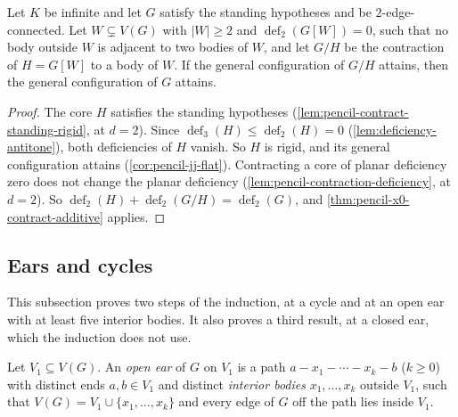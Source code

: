 \begin{corollary}
  \label{cor:pencil-x0-contract-rigid}
  \leanok
  Let $K$ be infinite and let $G$ satisfy the standing hypotheses and be
  $2$-edge-connected. Let $W \subsetneq V(G)$ with $|W| \ge 2$ and
  $\operatorname{def}_2(G[W]) = 0$, such that no body outside $W$ is
  adjacent to two bodies of $W$, and let $G/H$ be the contraction of
  $H = G[W]$ to a body of $W$. If the general configuration of $G/H$
  attains, then the general configuration of $G$ attains.
\end{corollary}
\begin{proof}
  \leanok
  The core $H$ satisfies the standing hypotheses
  (\cref{lem:pencil-contract-standing-rigid}, at $d = 2$). Since
  $\operatorname{def}_3(H) \le \operatorname{def}_2(H) = 0$
  (\cref{lem:deficiency-antitone}), both deficiencies of $H$ vanish. So
  $H$ is rigid, and its general configuration attains
  (\cref{cor:pencil-jj-flat}). Contracting a core of planar deficiency
  zero does not change the planar deficiency
  (\cref{lem:pencil-contraction-deficiency}, at $d = 2$). So
  $\operatorname{def}_2(H) + \operatorname{def}_2(G/H) =
  \operatorname{def}_2(G)$, and \cref{thm:pencil-x0-contract-additive}
  applies.
\end{proof}

\subsection{Ears and cycles}
\label{sec:main-component-chain}

This subsection proves two steps of the induction, at a cycle and at an
open ear with at least five interior bodies. It also proves a third
result, at a closed ear, which the induction does not use.

\begin{definition}
  \label{def:open-ear}
  \leanok
  Let $V_1 \subseteq V(G)$. An \emph{open ear} of $G$ on $V_1$ is a path
  $a - x_1 - \cdots - x_k - b$ ($k \ge 0$) with distinct ends
  $a, b \in V_1$ and distinct \emph{interior bodies} $x_1, \dots, x_k$
  outside $V_1$, such that $V(G) = V_1 \cup \{x_1, \dots, x_k\}$ and
  every edge of $G$ off the path lies inside $V_1$.
\end{definition}


